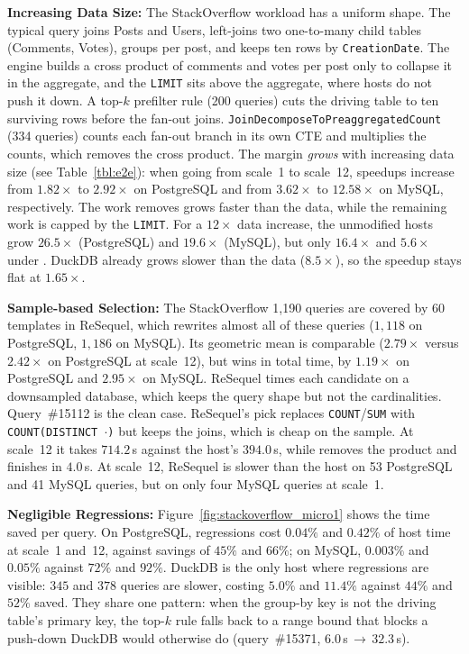 \textbf{Increasing Data Size:} The \textsf{StackOverflow} workload has a uniform shape. The typical query joins \textsf{Posts} and \textsf{Users}, left-joins two one-to-many child tables (\textsf{Comments}, \textsf{Votes}), groups per post, and keeps ten rows by \texttt{CreationDate}. The engine builds a cross product of comments and votes per post only to collapse it in the aggregate, and the \texttt{LIMIT} sits above the aggregate, where hosts do not push it down.  A top-$k$ prefilter rule (200 queries) cuts the driving table to ten surviving rows before the fan-out joins. \texttt{JoinDecomposeTo}\allowbreak\texttt{Preaggregated}\allowbreak\texttt{Count} (334 queries) counts each fan-out branch in its own CTE and multiplies the counts, which removes the cross product. 
%
The margin \emph{grows} with increasing data size (see Table~\ref{tbl:e2e}): when going from scale~1 to scale~12, speedups increase from $1.82\times$ to $2.92\times$ on PostgreSQL and from $3.62\times$ to $12.58\times$ on MySQL, respectively. The work {\sys} removes grows faster than the data, while the remaining work is capped by the \texttt{LIMIT}. For a $12\times$ data increase, the unmodified hosts grow $26.5\times$ (PostgreSQL) and $19.6\times$ (MySQL), but only $16.4\times$ and $5.6\times$ under {\sys}. DuckDB already grows slower than the data ($8.5\times$), so the speedup stays flat at $1.65\times$.\shorten

\textbf{Sample-based Selection:} The \textsf{StackOverflow} 1,190 queries are covered by 60 templates in ReSequel, which rewrites almost all of these queries ($1{,}118$ on PostgreSQL, $1{,}186$ on MySQL). Its geometric mean is comparable ($2.79\times$ versus $2.42\times$ on PostgreSQL at scale~12), but {\sys} wins in total time, by $1.19\times$ on PostgreSQL and $2.95\times$ on MySQL. ReSequel times each candidate on a downsampled database, which keeps the query shape but not the cardinalities. Query~\#15112 is the clean case. ReSequel's pick replaces \texttt{COUNT}/\texttt{SUM} with \texttt{COUNT(DISTINCT $\cdot$)} but keeps the joins, which is cheap on the sample. At scale~12 it takes $714.2$\,s against the host's $394.0$\,s, while {\sys} removes the product and finishes in $4.0$\,s. At scale~12, ReSequel is slower than the host on 53 PostgreSQL and 41 MySQL queries, but on only four MySQL queries at scale~1.

\textbf{Negligible Regressions:} Figure~\ref{fig:stackoverflow_micro1} shows the time {\sys} saved per query. On PostgreSQL, regressions cost $0.04\%$ and $0.42\%$ of host time at scale~1 and~12, against savings of $45\%$ and $66\%$; on MySQL, $0.003\%$ and $0.05\%$ against $72\%$ and $92\%$. DuckDB is the only host where regressions are visible: $345$ and $378$ queries are slower, costing $5.0\%$ and $11.4\%$ against $44\%$ and $52\%$ saved. They share one pattern: when the group-by key is not the driving table's primary key, the top-$k$ rule falls back to a range bound that blocks a push-down DuckDB would otherwise do (query~\#15371, $6.0$\,s\,$\to$\,$32.3$\,s).

